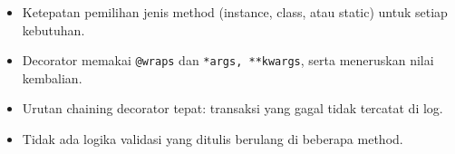 \begin{penting}
\begin{itemize}
  \item Ketepatan pemilihan jenis method (instance, class, atau static) untuk setiap kebutuhan.
  \item Decorator memakai \texttt{@wraps} dan \texttt{*args, **kwargs}, serta meneruskan nilai kembalian.
  \item Urutan chaining decorator tepat: transaksi yang gagal tidak tercatat di log.
  \item Tidak ada logika validasi yang ditulis berulang di beberapa method.
\end{itemize}
\end{penting}